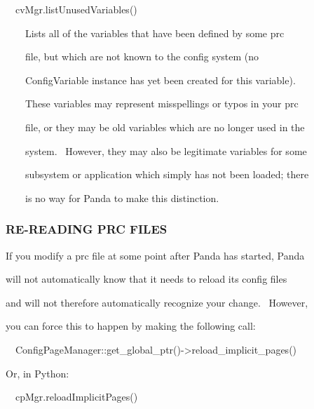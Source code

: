 \documentclass[a4paper]{article}
\begin{document}
\bigskip

{\color{black}
\ \ cvMgr.listUnusedVariables()}


\bigskip

{\color{black}
\ \ \ \ Lists all of the variables that have been defined by some prc}

{\color{black}
\ \ \ \ file, but which are not known to the config system (no}

{\color{black}
\ \ \ \ ConfigVariable instance has yet been created for this variable).}

{\color{black}
\ \ \ \ These variables may represent misspellings or typos in your prc}

{\color{black}
\ \ \ \ file, or they may be old variables which are no longer used in the}

{\color{black}
\ \ \ \ system. \ However, they may also be legitimate variables for some}

{\color{black}
\ \ \ \ subsystem or application which simply has not been loaded; there}

{\color{black}
\ \ \ \ is no way for Panda to make this distinction.}


\bigskip


\bigskip

\subsubsection[RE{}-READING PRC FILES]{RE-READING PRC FILES}
\hypertarget{RefHeading312381927442421}{}
\bigskip

{\color{black}
If you modify a prc file at some point after Panda has started, Panda}

{\color{black}
will not automatically know that it needs to reload its config files}

{\color{black}
and will not therefore automatically recognize your change. \ However,}

{\color{black}
you can force this to happen by making the following call:}


\bigskip

{\color{black}
\ \ ConfigPageManager::get\_global\_ptr()-{\textgreater}reload\_implicit\_pages()}


\bigskip

{\color{black}
Or, in Python:}


\bigskip

{\color{black}
\ \ cpMgr.reloadImplicitPages()}


\bigskip
\end{document}
